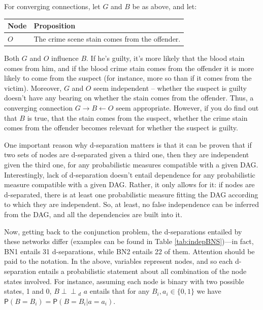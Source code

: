 \documentclass[
  10pt,
  dvipsnames,enabledeprecatedfontcommands]{scrartcl}
\newcommand{\indep}{\!\perp \!\!\! \perp\!}
\newcommand{\pr}[1]{\ensuremath{\mathsf{P}(#1)}}
\begin{document}
For converging connections, let \(G\) and \(B\) be as above, and let:

\begin{center}
\begin{tabular}{@{}lp{4.3cm}@{}}\toprule
Node & Proposition \\ \midrule 
$O$ & The crime scene stain comes from the offender.\\
\bottomrule
\end{tabular}
\end{center}
\normalsize

\noindent Both \(G\) and \(O\) influence \(B\). If he's guilty, it's
more likely that the blood stain comes from him, and if the blood crime
stain comes from the offender it is more likely to come from the suspect
(for instance, more so than if it comes from the victim). Moreover,
\(G\) and \(O\) seem independent -- whether the suspect is guilty
doesn't have any bearing on whether the stain comes from the offender.
Thus, a converging connection \(G\rightarrow B \leftarrow O\) seem
appropriate. However, if you do find out that \(B\) is true, that the
stain comes from the suspect, whether the crime stain comes from the
offender becomes relevant for whether the suspect is guilty.

One important reason why d-separation matters is that it can be proven
that if two sets of nodes are d-separated given a third one, then they
are independent given the third one, for any probabilistic measures
compatible with a given DAG. Interestingly, lack of d-separation doesn't
entail dependence for any probabilistic measure compatible with a given
DAG. Rather, it only allows for it: if nodes are d-separated, there is
at least one probabilistic measure fitting the DAG according to which
they are independent. So, at least, no false independence can be
inferred from the DAG, and all the dependencies are built into it.

Now, getting back to the conjunction problem, the d-separations entailed
by these networks differ (examples can be found in Table
\ref{tab:indepBNS})---in fact, \textsf{BN1} entails 31 d-separations,
while \textsf{BN2} entails 22 of them. Attention should be paid to the
notation. In the above, variables represent nodes, and so each
d-separation entails a probabilistic statement about all combination of
the node states involved. For instance, assuming each node is binary
with two possible states, 1 and 0, \mbox{$B   \indep_d\,\,  a $} entails
that for any \mbox{$ B_i, a_i \in \{0, 1\}$} we have
\(\pr{B = B_i} = \pr{B = B_i \vert a = a_i}\).
\end{document}
